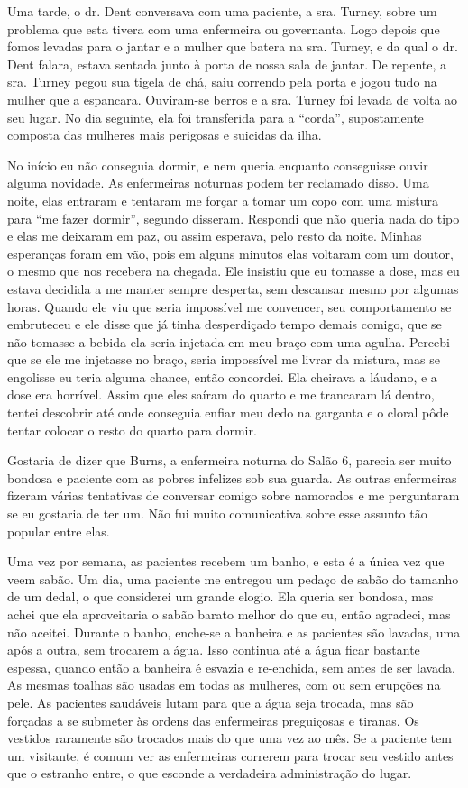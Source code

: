 Uma tarde, o dr. Dent conversava com uma paciente, a sra. Turney, sobre
um problema que esta tivera com uma enfermeira ou governanta. Logo
depois que fomos levadas para o jantar e a mulher que batera na sra.
Turney, e da qual o dr. Dent falara, estava sentada junto à porta de
nossa sala de jantar. De repente, a sra. Turney pegou sua tigela de chá,
saiu correndo pela porta e jogou tudo na mulher que a espancara.
Ouviram-se berros e a sra. Turney foi levada de volta ao seu lugar. No
dia seguinte, ela foi transferida para a ``corda'', supostamente
composta das mulheres mais perigosas e suicidas da ilha.

No início eu não conseguia dormir, e nem queria enquanto conseguisse
ouvir alguma novidade. As enfermeiras noturnas podem ter reclamado
disso. Uma noite, elas entraram e tentaram me forçar a tomar um copo com
uma mistura para ``me fazer dormir'', segundo disseram. Respondi que não
queria nada do tipo e elas me deixaram em paz, ou assim esperava, pelo
resto da noite. Minhas esperanças foram em vão, pois em alguns minutos
elas voltaram com um doutor, o mesmo que nos recebera na chegada. Ele
insistiu que eu tomasse a dose, mas eu estava decidida a me manter
sempre desperta, sem descansar mesmo por algumas horas. Quando ele viu
que seria impossível me convencer, seu comportamento se embruteceu e ele
disse que já tinha desperdiçado tempo demais comigo, que se não tomasse
a bebida ela seria injetada em meu braço com uma agulha. Percebi que se
ele me injetasse no braço, seria impossível me livrar da mistura, mas se
engolisse eu teria alguma chance, então concordei. Ela cheirava a
láudano, e a dose era horrível. Assim que eles saíram do quarto e me
trancaram lá dentro, tentei descobrir até onde conseguia enfiar meu dedo
na garganta e o cloral pôde tentar colocar o resto do quarto para
dormir.

Gostaria de dizer que Burns, a enfermeira noturna do Salão 6, parecia
ser muito bondosa e paciente com as pobres infelizes sob sua guarda. As
outras enfermeiras fizeram várias tentativas de conversar comigo sobre
namorados e me perguntaram se eu gostaria de ter um. Não fui muito
comunicativa sobre esse assunto tão popular entre elas.

Uma vez por semana, as pacientes recebem um banho, e esta é a única vez
que veem sabão. Um dia, uma paciente me entregou um pedaço de sabão do
tamanho de um dedal, o que considerei um grande elogio. Ela queria ser
bondosa, mas achei que ela aproveitaria o sabão barato melhor do que eu,
então agradeci, mas não aceitei. Durante o banho, enche-se a banheira e
as pacientes são lavadas, uma após a outra, sem trocarem a água. Isso
continua até a água ficar bastante espessa, quando então a banheira é
esvazia e re-enchida, sem antes de ser lavada. As mesmas toalhas são
usadas em todas as mulheres, com ou sem erupções na pele. As pacientes
saudáveis lutam para que a água seja trocada, mas são forçadas a se
submeter às ordens das enfermeiras preguiçosas e tiranas. Os vestidos
raramente são trocados mais do que uma vez ao mês. Se a paciente tem um
visitante, é comum ver as enfermeiras correrem para trocar seu vestido
antes que o estranho entre, o que esconde a verdadeira administração do
lugar.

